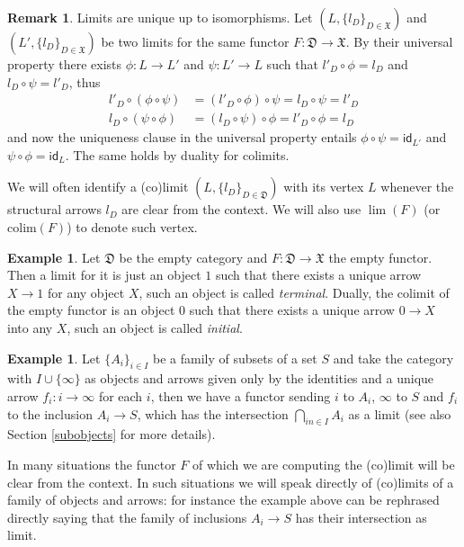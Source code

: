 \documentclass[12pt]{article}
\theoremstyle{definition}
\newtheorem{remark}[lemma]{Remark}
\newtheorem{example}[lemma]{Example}
\def\D{\mathfrak D}
\def\X{\mathfrak X}
\numberwithin{equation}{section}
\newcommand{\colim}[0]{\mathrm{colim}}
\newcommand{\id}[1]{\mathsf{id}_{#1}}
\begin{document}
\begin{remark}
	Limits are unique up to isomorphisms. Let $(L, \{l_D\}_{D\in \X})$ and $(L', \{l_D\}_{D\in \X})$ be two limits for the same functor $F:\D\rightarrow \X$. By their universal property there exists $\phi:L\rightarrow L'$ and $\psi:L'\rightarrow L$ such that
	$l'_D\circ \phi= l_D$ and $l_D\circ \psi =l'_D$, thus
	\begin{align*}
	l'_D\circ (\phi\circ \psi)&=(l'_D\circ \phi)\circ \psi=l_D\circ \psi=l'_D\\
	l_D\circ (\psi \circ \phi)&=(l_D\circ \psi)\circ \phi=l'_D\circ \phi=l_D
	\end{align*}
	and now the uniqueness clause in the universal property entails $\phi\circ \psi=\id{L'}$ and $\psi \circ \phi=\id{L}$. The same holds by duality for colimits. 
\end{remark}
 
 We will often identify a (co)limit $(L, \{l_D\}_{D\in \D})$ with its vertex $L$ whenever the structural arrows $l_D$ are clear from the context. We will also use $\lim(F)$ (or $\colim(F)$) to denote such vertex.
 \begin{example}Let $\D$ be the empty category and $F:\D\rightarrow \X$ the empty functor. Then a limit for it is just an object $1$ such that there exists a unique arrow $X\rightarrow 1$ for any object $X$, such an object is called \emph{terminal}. Dually, the colimit of the empty functor is an object $0$ such that there exists a unique arrow $0\rightarrow X$ into any $X$, such an object is called \emph{initial}.
 \end{example}
 
 \begin{example}\label{intersection}
 	Let $\{A_i\}_{i\in I}$ be a family of subsets of a set $S$ and take the category with $I\cup \{\infty\}$ as objects and arrows given only by the identities and a unique arrow $f_i:i\rightarrow \infty$ for each $i$, then we have a functor sending $i$ to $A_i$, $\infty$ to $S$ and $f_i$ to the inclusion $A_i\rightarrow S$, which has the intersection $\bigcap_{in\in I}A_i$ as a  limit (see also Section \ref{subobjects} for more details).
 \end{example}
 
 In many situations the functor $F$ of which we are computing the (co)limit will be clear from the context. In such situations we will speak directly of (co)limits of a family of objects and arrows: for instance the example above can be rephrased directly saying that the family of inclusions $A_i\rightarrow S$ has their intersection as limit.
 
\end{document}
